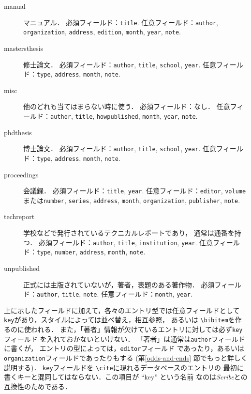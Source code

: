 \begin{description}
\item[manual\hfill] マニュアル．
必須フィールド：{\tt title}.
任意フィールド：{\tt author}, {\tt organization},
{\tt address}, {\tt edition}, {\tt month}, {\tt year},
{\tt note}.

\item[mastersthesis\hfill] 修士論文．
必須フィールド：{\tt author}, {\tt title}, {\tt school},
{\tt year}.
任意フィールド：{\tt type}, {\tt address}, {\tt month},
{\tt note}.

\item[misc\hfill] 他のどれも当てはまらない時に使う．
必須フィールド：なし．
任意フィールド：{\tt author}, {\tt title}, {\tt howpublished},
{\tt month}, {\tt year}, {\tt note}.

\item[phdthesis\hfill] 博士論文．
必須フィールド：{\tt author}, {\tt title}, {\tt school},
{\tt year}.
任意フィールド：{\tt type}, {\tt address}, {\tt month},
{\tt note}.

\item[proceedings\hfill] 会議録．
必須フィールド：{\tt title}, {\tt year}.
任意フィールド：{\tt editor}, {\tt volume}または{\tt number},
{\tt series}, {\tt address}, {\tt month},
{\tt organization}, {\tt publisher}, {\tt note}.


\item[techreport\hfill] 学校などで発行されているテクニカルレポートであり，
通常は通番を持つ．
必須フィールド：{\tt author},
{\tt title}, {\tt institution}, {\tt year}.
任意フィールド：{\tt type}, {\tt number}, {\tt address},
{\tt month}, {\tt note}.

\item[unpublished\hfill] 正式には主版されていないが，著者，表題のある著作物．
必須フィールド：{\tt author}, {\tt title}, {\tt note}.
任意フィールド：{\tt month}, {\tt year}.

\end{description}

上に示したフィールドに加えて，各々のエントリ型では任意フィールドとして
{\tt key}があり，スタイルによっては並べ替え，相互参照，
あるいは \verb|\bibitem|を作るのに使われる．
また，「著者」情報が欠けているエントリに対しては必ず{\tt key}フィールド
を入れておかないといけない．
「著者」は通常は{\tt author}フィールドに書くが，
エントリの型によっては，{\tt editor}フィールド
であったり，あるいは{\tt organization}フィールドであったりもする
(第\ref{odds-and-ends} 節でもっと詳しく説明する)．
{\tt key}フィールドを \verb|\cite|に現れるデータベースのエントリの 最初に書くキーと混同してはならない．この項目が ``key'' という名前
なのは{\it Scribe}との互換性のためである．

